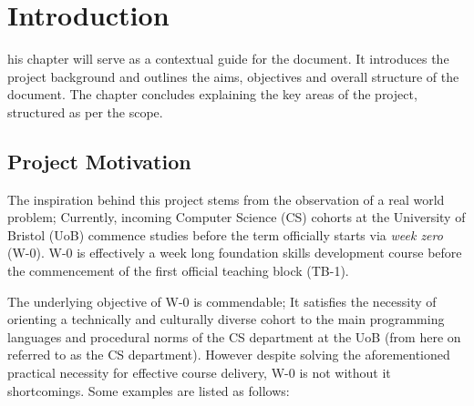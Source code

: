 %
%
\let\textcircled=\pgftextcircled
\chapter{Introduction}
\label{chap:intro}

his chapter will serve as a contextual guide for the document. It introduces the project background and outlines the aims, objectives and overall structure of the document. The chapter concludes explaining the key areas of the project, structured as per the scope.


\section{Project Motivation}
\label{sec1:sec01}


The inspiration behind this project stems from the observation of a real world problem; Currently, incoming Computer Science (CS) cohorts at the University of Bristol (UoB) commence studies before the term officially starts via \textit{week zero} (W-0). W-0 is effectively a week long foundation skills development course before the commencement of the first official teaching block (TB-1).

The underlying objective of W-0 is commendable; It satisfies the necessity of orienting a technically and culturally diverse cohort to the main programming languages and procedural norms of the CS department at the UoB (from here on referred to as the CS department). However despite solving the aforementioned practical necessity for effective course delivery, W-0 is not without it shortcomings. Some examples are listed as follows:

